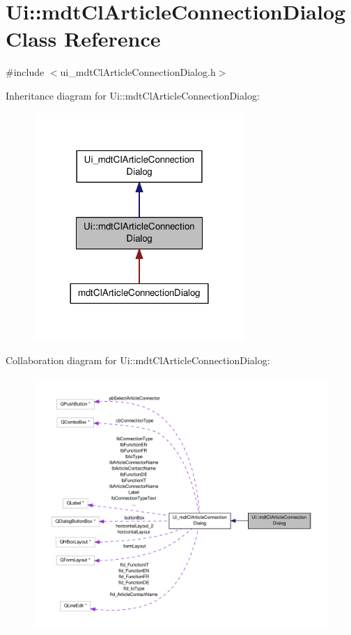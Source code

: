 \hypertarget{class_ui_1_1mdt_cl_article_connection_dialog}{\section{Ui\-:\-:mdt\-Cl\-Article\-Connection\-Dialog Class Reference}
\label{class_ui_1_1mdt_cl_article_connection_dialog}
}


{\ttfamily \#include $<$ui\-\_\-mdt\-Cl\-Article\-Connection\-Dialog.\-h$>$}



Inheritance diagram for Ui\-:\-:mdt\-Cl\-Article\-Connection\-Dialog\-:
\nopagebreak
\begin{figure}[H]
\begin{center}
\leavevmode
\includegraphics[width=228pt]{class_ui_1_1mdt_cl_article_connection_dialog__inherit__graph}
\end{center}
\end{figure}


Collaboration diagram for Ui\-:\-:mdt\-Cl\-Article\-Connection\-Dialog\-:
\nopagebreak
\begin{figure}[H]
\begin{center}
\leavevmode
\includegraphics[width=350pt]{class_ui_1_1mdt_cl_article_connection_dialog__coll__graph}
\end{center}
\end{figure}
